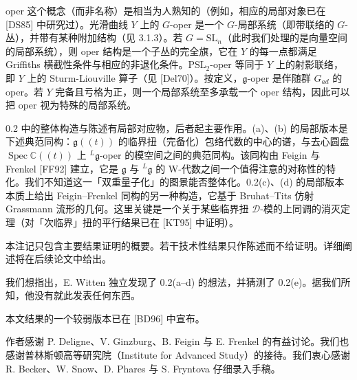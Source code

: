 
 oper 这个概念（而非名称）是相当为人熟知的（例如，相应的局部对象已在 [DS85] 中研究过）。光滑曲线 $Y$ 上的 $G$-oper 是一个 $G$-局部系统（即带联络的 $G$-丛），并带有某种附加结构（见 3.1.3）。若 $G=\mathrm{SL}_n$（此时我们处理的是向量空间的局部系统），则 oper 结构是一个子丛的完全旗，它在 $Y$ 的每一点都满足 Griffiths 横截性条件与相应的非退化条件。$\mathrm{PSL}_2$-oper 等同于 $Y$ 上的射影联络，即 $Y$ 上的 Sturm-Liouville 算子（见 [Del70]）。按定义，$\mathfrak{g}$-oper 是伴随群 $G_{ad}$ 的 oper。若 $Y$ 完备且亏格为正，则一个局部系统至多承载一个 oper 结构，因此可以把 oper 视为特殊的局部系统。

 0.2 中的整体构造与陈述有局部对应物，后者起主要作用。(a)、(b) 的局部版本是下述典范同构：$\mathfrak{g}((t))$ 的临界扭（完备化）包络代数的中心的谱，与去心圆盘 $\operatorname{Spec}\mathbb{C}((t))$ 上 $^{L}\mathfrak{g}$-oper 的模空间之间的典范同构。该同构由 Feigin 与 Frenkel [FF92] 建立，它是 $\mathfrak{g}$ 与 $^{L}\mathfrak{g}$ 的 W-代数之间一个值得注意的对称性的特化。我们不知道这一「双重量子化」的图景能否整体化。0.2(c)、(d) 的局部版本本质上给出 Feigin--Frenkel 同构的另一种构造，它基于 Bruhat--Tits 仿射 Grassmann 流形的几何。这里关键是一个关于某些临界扭 $\mathcal{D}$-模的上同调的消灭定理（对「次临界」扭的平行结果已在 [KT95] 中证明）。

 本注记只包含主要结果证明的概要。若干技术性结果只作陈述而不给证明。详细阐述将在后续论文中给出。

 我们想指出，E. Witten 独立发现了 0.2(a--d) 的想法，并猜测了 0.2(e)。据我们所知，他没有就此发表任何东西。

 本文结果的一个较弱版本已在 [BD96] 中宣布。


 作者感谢 P. Deligne、V. Ginzburg、B. Feigin 与 E. Frenkel 的有益讨论。我们也感谢普林斯顿高等研究院（Institute for Advanced Study）的接待。我们衷心感谢 R. Becker、W. Snow、D. Phares 与 S. Fryntova 仔细录入手稿。
